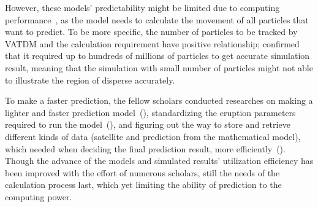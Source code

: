 \documentclass{article}
\begin{document}
\begin{doublespacing}
{  However, these models’ predictability might be limited due to computing 
  performance~\citep[p.745-746]{Tanaka2022}, as the model needs to calculate the movement of all 
  particles that want to predict. To be more specific, the number of particles to be tracked by 
  VATDM and the calculation requirement have positive relationship; \citet{SCOLLO2011129} confirmed 
  that it required up to hundreds of millions of particles to get accurate simulation result, 
  meaning that the simulation with small number of particles might not able to illustrate the 
  region of disperse accurately.

  To make a faster prediction, the fellow scholars conducted researches on making a lighter and 
  faster prediction model~(\citet{Searcy1998}), standardizing the eruption parameters required to 
  run the model~(\citet[p.7]{Webley2009}), and figuring out the way to store and retrieve different 
  kinds of data (satellite and prediction from the mathematical model), which needed when deciding 
  the final prediction result, more efficiently~(\citet{Sorokin2016}). Though the advance of the 
  models and simulated results' utilization efficiency has been improved with the effort of numerous
  scholars, still the needs of the calculation process last, which yet limiting the ability of 
  prediction to the computing power.

  \fontsize{10pt}{10.5pt} 

}
\end{doublespacing}
\end{document}
